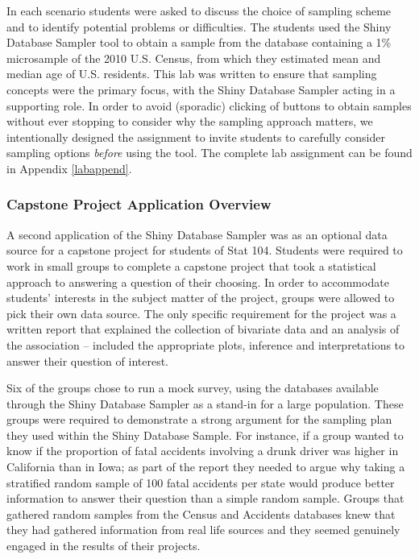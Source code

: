 \documentclass[11pt]{isuthesis}\usepackage[]{graphicx}\usepackage[]{color}
\begin{document}
In each scenario students were asked to discuss the choice of sampling scheme and to identify potential problems or difficulties. The students used the Shiny Database Sampler tool to obtain a sample from the database containing a 1\% microsample of the 2010 U.S. Census, from which they estimated mean and median age of U.S. residents. This lab was written to ensure that sampling concepts were the primary focus, with the Shiny Database Sampler acting in a supporting role. In order to avoid (sporadic) clicking of buttons to obtain samples without ever stopping to consider why the sampling approach matters, we intentionally designed the assignment to invite students to carefully consider sampling options {\it before} using the tool. The complete lab assignment can be found in Appendix \ref{labappend}. 


\subsubsection{Capstone Project Application Overview} 
\label{ProjectOverview} 

A second application of the Shiny Database Sampler was as an optional data source for a capstone project for students of Stat 104. Students were required to work in small groups to complete a capstone project that took a statistical approach to answering a question of their choosing. In order to accommodate students' interests in the subject matter of the project, groups were allowed to pick their own data source. The only specific requirement for the project was a written report that explained the collection of bivariate data and an analysis of the association -- included the appropriate plots, inference and interpretations to answer their question of interest.

Six of the groups chose to run a mock survey, using the databases available through the Shiny Database Sampler as a stand-in for a large population. These groups were required to demonstrate a strong argument for the sampling plan they used within the Shiny Database Sample. For instance, if a group wanted to know if the proportion of fatal accidents involving a drunk driver was higher in California than in Iowa; as part of the report they needed to argue why taking a stratified random sample of 100 fatal accidents per state would produce better information to answer their question than a simple random sample. Groups that gathered random samples from the Census and Accidents databases knew that they had gathered information from real life sources and they seemed genuinely engaged in the results of their projects. 
 
\end{document}

